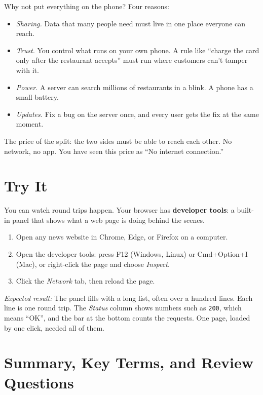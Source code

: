 Why not put everything on the phone? Four reasons:

\begin{itemize}
\tightlist
\item
  \emph{Sharing.} Data that many people need must live in one place everyone can reach.
\item
  \emph{Trust.} You control what runs on your own phone. A rule like ``charge the card only after the restaurant accepts'' must run where customers can't tamper with it.
\item
  \emph{Power.} A server can search millions of restaurants in a blink. A phone has a small battery.
\item
  \emph{Updates.} Fix a bug on the server once, and every user gets the fix at the same moment.
\end{itemize}

The price of the split: the two sides must be able to reach each other. No network, no app. You have seen this price as ``No internet connection.''

\section{Try It}\label{01-two-sides-of-every-app:try-it}

You can watch round trips happen. Your browser has \textbf{developer tools}: a built-in panel that shows what a web page is doing behind the scenes.

\begin{enumerate}
\def\labelenumi{\arabic{enumi}.}
\tightlist
\item
  Open any news website in Chrome, Edge, or Firefox on a computer.
\item
  Open the developer tools: press F12 (Windows, Linux) or Cmd+Option+I (Mac), or right-click the page and choose \emph{Inspect}.
\item
  Click the \emph{Network} tab, then reload the page.
\end{enumerate}

\emph{Expected result:} The panel fills with a long list, often over a hundred lines. Each line is one round trip. The \emph{Status} column shows numbers such as \texttt{200}, which means ``OK'', and the bar at the bottom counts the requests. One page, loaded by one click, needed all of them.

\section{Summary, Key Terms, and Review Questions}\label{01-two-sides-of-every-app:summary-key-terms-and-review-questions}

